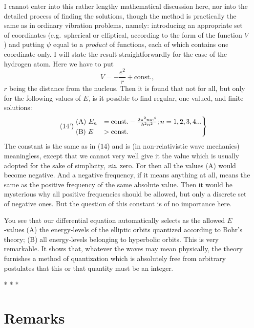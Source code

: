 I cannot enter into this rather lengthy mathematical discussion here,
nor into the detailed process of finding the solutions, though the
method is practically the same as in ordinary vibration problems,
namely: introducing an appropriate set of coordinates (e.g.\ spherical or
elliptical, according to the form of the function $V$) and putting
$\psi$ equal to a \emph{product} of functions, each of which contains
one coordinate only. I will state the result straightforwardly for the
case of the hydrogen atom. Here we have to put
\begin{equation}
V = -\frac{e^2}{r} + \text{const.,}  %
\end{equation}
$r$ being the distance from the nucleus. Then it is found that not
for all, but only for the following values of $E$, is it possible
to find regular, one‑valued, and finite solutions:
\begin{equation*}\tag{14'}
\begin{rcases}
  \text{(A) } E_n &= \text{const.} - \frac{2\pi^2me^4}{h^2n^2}; n=1,2,3,4... \\
  \text{(B) } E &> \text{const.} %
\end{rcases}
\end{equation*}
The constant is the same as in (14) and is (in non‑rela­tivistic wave
mechanics) meaningless, except that we cannot very well give it the
value which is usually adopted for the sake of simplicity, \emph{viz}.
zero. For then all the values (A) would become negative. And a negative
frequency, if it means anything at all, means the same as the positive
frequency of the same absolute value. Then it would be mysterious why
all positive frequencies should be allowed, but only a discrete set of
negative ones. But the question of this constant is of no importance
here.

You see that our differential equation automatically selects as the
allowed $E$‑values (A) the energy‑levels of the elliptic orbits
quantized according to Bohr's theory; (B) all energy‑levels belonging to
hyperbolic orbits. This is very remarkable. It shows that, whatever the
waves may mean physically, the theory furnishes a method of quantization
which is absolutely free from arbitrary postulates that this or that
quantity must be an integer.

\centerline{* * *}


\section*{Remarks}


